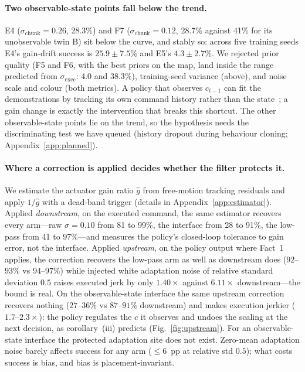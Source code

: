 \documentclass{article}
\newcommand{\sexec}{\sigma_{\mathrm{exec}}}
\newcommand{\schunk}{\sigma_{\mathrm{chunk}}}
\begin{document}
\paragraph{Two observable-state points fall below the trend.} E4 ($\schunk=0.26$, 28.3\%) and F7 ($\schunk=0.12$, 28.7\% against 41\% for its unobservable twin B) sit below the curve, and stably so: across five training seeds E4's gain-drift success is $25.9\pm7.5\%$ and E5's $4.3\pm2.7\%$. We rejected prior quality (F5 and F6, with the best priors on the map, land inside the range predicted from $\sexec$: 4.0 and 38.3\%), training-seed variance (above), and noise scale and colour (both metrics). A policy that observes $c_{t-1}$ can fit the demonstrations by tracking its own command history rather than the state~\citep{wen2020copycat}; a gain change is exactly the intervention that breaks this shortcut. The other observable-state points lie on the trend, so the hypothesis needs the discriminating test we have queued (history dropout during behaviour cloning; Appendix~\ref{app:planned}).

\paragraph{Where a correction is applied decides whether the filter protects it.} We estimate the actuator gain ratio $\hat g$ from free-motion tracking residuals and apply $1/\hat g$ with a dead-band trigger (details in Appendix~\ref{app:estimator}). Applied \emph{downstream}, on the executed command, the same estimator recovers every arm---raw $\sigma=0.10$ from 81 to 99\%, the interface from 28 to 91\%, the low-pass from 41 to 97\%---and measures the policy's closed-loop tolerance to gain error, not the interface. Applied \emph{upstream}, on the policy output where Fact~1 applies, the correction recovers the low-pass arm as well as downstream does ($92$--$93\%$ vs $94$--$97\%$) while injected white adaptation noise of relative standard deviation $0.5$ raises executed jerk by only $1.40\times$ against $6.11\times$ downstream---the bound is real. On the observable-state interface the same upstream correction recovers nothing ($27$--$36\%$ vs $87$--$91\%$ downstream) and makes execution jerkier ($1.7$--$2.3\times$): the policy regulates the $c$ it observes and undoes the scaling at the next decision, as corollary~(iii) predicts (Fig.~\ref{fig:upstream}). For an observable-state interface the protected adaptation site does not exist. Zero-mean adaptation noise barely affects success for any arm ($\le6$~pp at relative std $0.5$); what costs success is bias, and bias is placement-invariant.
\end{document}
